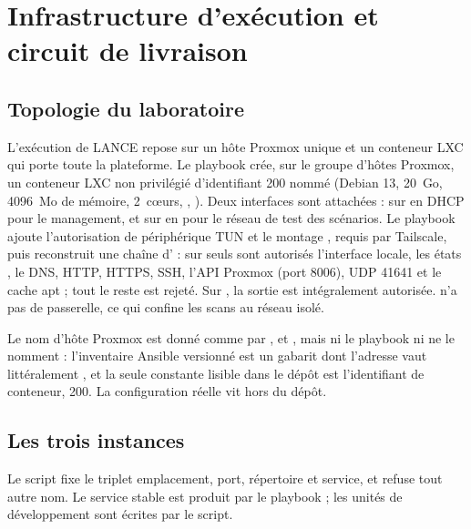 \section{Infrastructure d'exécution et circuit de livraison}
\label{sec:infrastructure}

\subsection{Topologie du laboratoire}

L'exécution de LANCE repose sur un hôte Proxmox unique et un conteneur LXC qui
porte toute la plateforme. Le playbook
 crée, sur le groupe
d'hôtes Proxmox, un conteneur LXC non privilégié d'identifiant 200 nommé
 (Debian 13, 20~Go, 4096~Mo de mémoire, 2~cœurs,
, ). Deux interfaces sont attachées :
 sur  en DHCP pour le management, et  sur
 en  pour le réseau de test des scénarios.
Le playbook ajoute l'autorisation de périphérique TUN et le montage
, requis par Tailscale, puis reconstruit une chaîne
 d' : sur  seuls sont autorisés
l'interface locale, les états , le DNS, HTTP, HTTPS,
SSH, l'API Proxmox (port 8006), UDP 41641 et le cache apt ; tout le reste est
rejeté. Sur , la sortie est intégralement autorisée.
 n'a pas de passerelle, ce qui confine les scans au réseau isolé.

Le nom d'hôte Proxmox est donné comme  par ,
 et , mais ni le
playbook ni  ne le nomment :
l'inventaire Ansible versionné est un gabarit dont l'adresse vaut littéralement
, et la seule constante lisible dans le dépôt est
l'identifiant de conteneur, 200. La configuration réelle vit hors du dépôt.

\subsection{Les trois instances}

Le script  fixe le triplet
emplacement, port, répertoire et service, et refuse tout autre nom. Le service
stable est produit par le playbook ; les unités de développement sont écrites
par le script.

